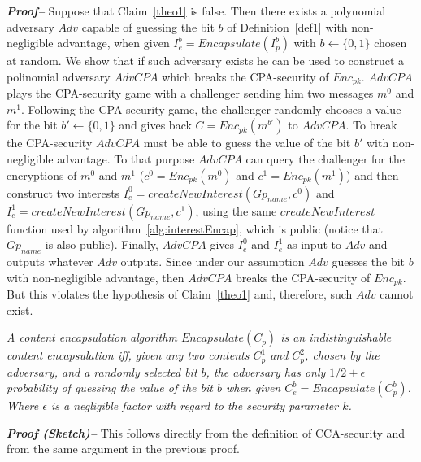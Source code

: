 \textit{\textbf{Proof--}} Suppose that Claim~\ref{theo1} is false. Then there exists a
polynomial adversary $Adv$ capable of guessing the bit $b$ of Definition~\ref{def1}
with non-negligible advantage, when given $I_e^b = Encapsulate(I_p^b)$ with
$b \leftarrow \{0,1\}$ chosen at random. We show that if such adversary exists he can
be used to construct a polinomial adversary $AdvCPA$ which breaks the CPA-security
of $Enc_{pk}$. $AdvCPA$ plays the CPA-security game with a challenger sending him
two messages $m^0$ and $m^1$. Following the CPA-security game, the challenger
randomly chooses a value for the bit $b' \leftarrow \{0,1\}$ and gives back
$C = Enc_{pk}(m^{b'})$ to $AdvCPA$. To break the CPA-security $AdvCPA$ must be
able to guess the value of the bit $b'$ with non-negligible advantage. To that
purpose $AdvCPA$ can query the challenger for the encryptions of $m^0$ and
$m^1$ ($c^0 = Enc_{pk}(m^0)$ and $c^1 = Enc_{pk}(m^1)$) and then construct two
interests $I_e^0 = createNewInterest(Gp_{name}, c^0)$ and $I_e^1 = createNewInterest(Gp_{name}, c^1)$,
using the same $createNewInterest$ function used by algorithm~\ref{alg:interestEncap},
which is public (notice that $Gp_{name}$ is also public). Finally, $AdvCPA$ gives $I_e^0$
and $I_e^1$ as input to $Adv$ and outputs whatever $Adv$ outputs. Since under our
assumption $Adv$ guesses the bit $b$ with non-negligible advantage, then $AdvCPA$ breaks
the CPA-security of $Enc_{pk}$. But this violates the hypothesis of Claim~\ref{theo1}
and, therefore, such $Adv$ cannot exist.

\begin{definition}
\textit{
A content encapsulation algorithm $Encapsulate(C_p)$ is an indistinguishable content
encapsulation iff, given any two contents $C_p^1$ and $C_p^2$, chosen by the adversary,
and a randomly selected bit $b$, the adversary has only $1/2 + \epsilon$ probability
of guessing the value of the bit $b$ when given $C_e^b = Encapsulate(C_p^b)$. Where
$\epsilon$ is a negligible factor with regard to the security parameter $k$.
}
\end{definition}


\textit{\textbf{Proof (Sketch)--}} This follows directly from the definition of
CCA-security and from the same argument in the previous proof.
